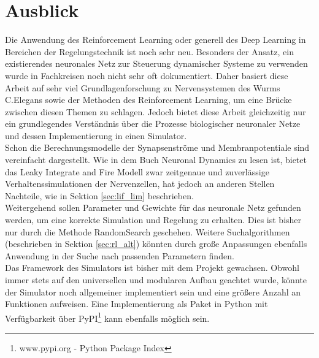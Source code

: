 \section{Ausblick}
\label{sec:erg_ausblick}
	Die Anwendung des Reinforcement Learning oder generell des Deep Learning in Bereichen der Regelungstechnik ist noch sehr neu. Besonders der Ansatz, ein existierendes neuronales Netz zur Steuerung dynamischer Systeme zu verwenden wurde in Fachkreisen noch nicht sehr oft dokumentiert. Daher basiert diese Arbeit auf sehr viel Grundlagenforschung zu Nervensystemen des Wurms C.Elegans \cite{CElegans} sowie der Methoden des Reinforcement Learning, um eine Brücke zwischen diesen Themen zu schlagen. Jedoch bietet diese Arbeit gleichzeitig nur ein grundlegendes Verständnis über die Prozesse biologischer neuronaler Netze und dessen Implementierung in einen Simulator.\\
	Schon die Berechnungsmodelle der Synapsenströme und Membranpotentiale sind vereinfacht dargestellt. Wie in dem Buch Neuronal Dynamics \cite{NeuronalDynamics} zu lesen ist, bietet das Leaky Integrate and Fire Modell zwar zeitgenaue und zuverlässige Verhaltenssimulationen der Nervenzellen, hat jedoch an anderen Stellen Nachteile, wie in Sektion \ref{sec:lif_lim} beschrieben.\\
	Weitergehend sollen Parameter und Gewichte für das neuronale Netz gefunden werden, um eine korrekte Simulation und Regelung zu erhalten. Dies ist bisher nur durch die Methode RandomSearch geschehen. Weitere Suchalgorithmen (beschrieben in Sektion \ref{sec:rl_alt}) könnten durch große Anpassungen ebenfalls Anwendung in der Suche nach passenden Parametern finden.\\
	Das Framework des Simulators ist bisher mit dem Projekt gewachsen. Obwohl immer stets auf den universellen und modularen Aufbau geachtet wurde, könnte der Simulator noch allgemeiner implementiert sein und eine größere Anzahl an Funktionen aufweisen. Eine Implementierung als Paket in Python mit Verfügbarkeit über PyPI\footnote{www.pypi.org - Python Package Index} kann ebenfalls möglich sein.	


